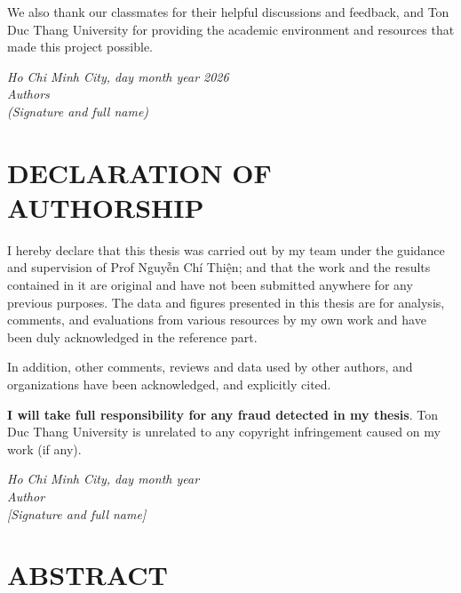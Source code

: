 \documentclass[12pt,a4paper]{report}
\begin{document}
  We also thank our classmates for their helpful discussions and feedback, and Ton Duc Thang University for providing the academic environment and resources that made this project possible.

  \vspace{3cm}
  \begin{flushright}
    \textit{Ho Chi Minh City, day \quad month \quad year 2026}\\
    \textit{Authors}\\[2cm]
    \textit{(Signature and full name)}
  \end{flushright}

  \chapter*{DECLARATION OF AUTHORSHIP}

  I hereby declare that this thesis was carried out by my team under the guidance and supervision of Prof Nguyễn Chí Thiện; and that the work and the results contained in it are original and have not been submitted anywhere for any previous purposes. The data and figures presented in this thesis are for analysis, comments, and evaluations from various resources by my own work and have been duly acknowledged in the reference part.

  In addition, other comments, reviews and data used by other authors, and organizations have been acknowledged, and explicitly cited.

  \textbf{I will take full responsibility for any fraud detected in my thesis}. Ton Duc Thang University is unrelated to any copyright infringement caused on my work (if any).

  \vspace{2cm}
  \begin{flushright}
    \textit{Ho Chi Minh City, day \quad month \quad year}\\
    \textit{Author}\\[2cm]
    \textit{[Signature and full name]}
  \end{flushright}

  \chapter*{ABSTRACT}
\end{document}
